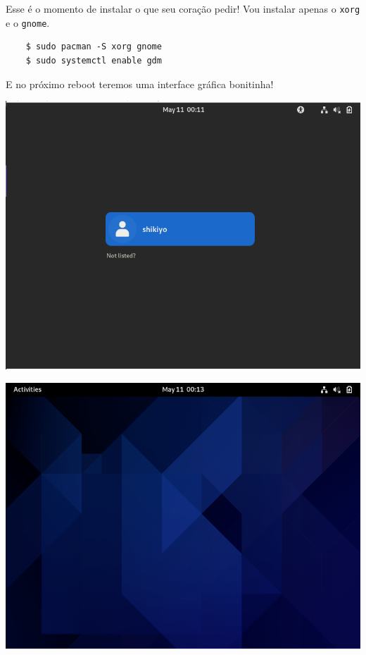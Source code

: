 \documentclass{article}
\begin{document}
Esse é o momento de instalar o que seu coração pedir!
Vou instalar apenas o \texttt{xorg} e o \texttt{gnome}.

\begin{verbatim}
    $ sudo pacman -S xorg gnome
    $ sudo systemctl enable gdm
\end{verbatim}

E no próximo reboot teremos uma interface gráfica bonitinha!

\begin{center}
    \includegraphics[width=\textwidth]{Imgs/Gnome-1.png}
\end{center}

\begin{center}
    \includegraphics[width=\textwidth]{Imgs/Gnome-2.png}
\end{center}
\end{document}
